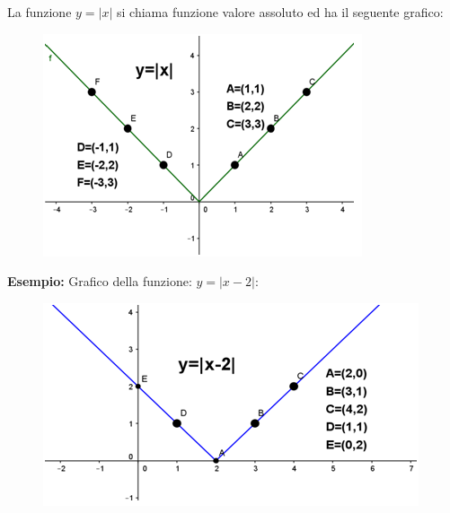 La funzione $y=|x|$ si chiama funzione valore assoluto ed ha il seguente 
grafico:

\begin{figure}[h]
\begin{inaccessibleblock}[TODO]
\centering
\includegraphics[width=0.9\linewidth]{img/imm2} %
\end{inaccessibleblock}
\label{fig:abs_imm2}
\end{figure}

\textbf{Esempio: } Grafico della funzione: $y=|x-2|$:

\begin{figure}[h]
\begin{inaccessibleblock}[TODO]
\centering
\includegraphics[width=0.9\linewidth]{img/imm3} %
\end{inaccessibleblock}
\label{fig:abs_imm3}
\end{figure}

